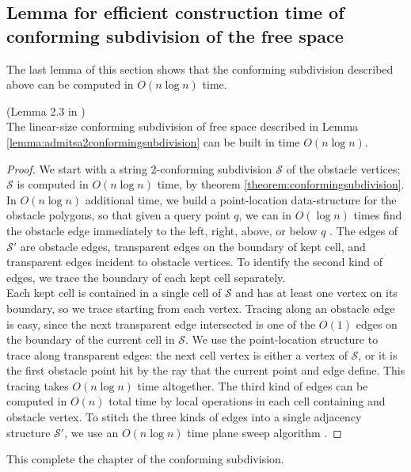 \subsection{Lemma for efficient construction time of conforming subdivision of the free space}

The last lemma of this section shows that the conforming subdivision described above can be computed in $O(n\log n)$ time.

\begin{Lemma} (Lemma 2.3 in \cite{HershbergerS99})\\
The linear-size conforming subdivision of free space described in Lemma \ref{lemma:admitsa2conformingsubdivision} can be built in time $O(n\log n)$.
\end{Lemma}

\begin{proof}
We start with a string 2-conforming subdivision $\mathcal{S}$ of the obstacle vertices; $\mathcal{S}$ is computed in $O(n\log n)$ time, by theorem \ref{theorem:conformingsubdivision}. In $O(n\log n)$ additional time, we build a point-location data-structure for the obstacle polygons, so that given a query point $q$, we can in $O(\log n)$ times find the obstacle edge immediately to the left, right, above, or below $q$ \cite{EdelsbrunnerGS86}\cite{Kirkpatrick83}. The edges of $\mathcal{S}'$ are obstacle edges, transparent edges on the boundary of kept cell, and transparent edges incident to obstacle vertices. To identify the second kind of edges, we trace the boundary of each kept cell separately. \\

Each kept cell is contained in a single cell of $\mathcal{S}$ and has at least one vertex on its boundary, so we trace starting from each vertex. Tracing along an obstacle edge is easy, since the next transparent edge intersected is one of the $O(1)$ edges on the boundary of the current cell in $\mathcal{S}$. We use the point-location structure to trace along transparent edges: the next cell vertex is either a vertex of $\mathcal{S}$, or it is the first obstacle point hit by the ray that the current point and edge define. This tracing takes $O(n\log n)$ time altogether. The third kind of edges can be computed in $O(n)$ total time by local operations in each cell containing and obstacle vertex. To stitch the three kinds of edges into a single adjacency structure $\mathcal{S}'$, we use an $O(n \log n)$ time plane sweep algorithm \cite{CompGeo}.
\end{proof}

This complete the chapter of the conforming subdivision. 
